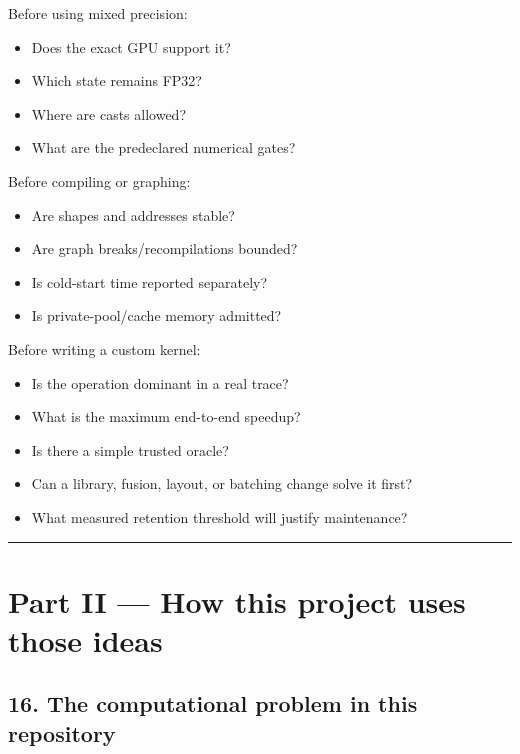 \documentclass[
  10pt,
  letterpaper,
]{article}
\providecommand{\tightlist}{%
  \setlength{\itemsep}{0pt}\setlength{\parskip}{0pt}}
\begin{document}
Before using mixed precision:

\begin{itemize}
\tightlist
\item
  Does the exact GPU support it?
\item
  Which state remains FP32?
\item
  Where are casts allowed?
\item
  What are the predeclared numerical gates?
\end{itemize}

Before compiling or graphing:

\begin{itemize}
\tightlist
\item
  Are shapes and addresses stable?
\item
  Are graph breaks/recompilations bounded?
\item
  Is cold-start time reported separately?
\item
  Is private-pool/cache memory admitted?
\end{itemize}

Before writing a custom kernel:

\begin{itemize}
\tightlist
\item
  Is the operation dominant in a real trace?
\item
  What is the maximum end-to-end speedup?
\item
  Is there a simple trusted oracle?
\item
  Can a library, fusion, layout, or batching change solve it first?
\item
  What measured retention threshold will justify maintenance?
\end{itemize}

\begin{center}\rule{0.5\linewidth}{0.5pt}\end{center}

\section{Part II --- How this project uses those
ideas}\label{part-ii--how-this-project-uses-those-ideas}

\subsection{16. The computational problem in this
repository}\label{16-the-computational-problem-in-this-repository}
\end{document}
